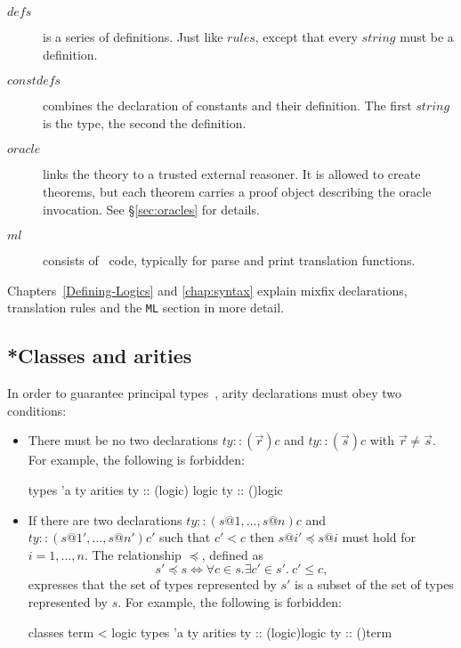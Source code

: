 \begin{description}
\item[$defs$]
  is a series of definitions.  Just like $rules$, except that every $string$
  must be a definition.

\item[$constdefs$] combines the declaration of constants and their
  definition. The first $string$ is the type, the second the definition.

\item[$oracle$] links the theory to a trusted external reasoner.  It is
  allowed to create theorems, but each theorem carries a proof object
  describing the oracle invocation.  See \S\ref{sec:oracles} for details.

\item[$ml$] 
  consists of \ML\ code, typically for parse and print translation functions.
\end{description}
%
Chapters~\ref{Defining-Logics} and \ref{chap:syntax} explain mixfix
declarations, translation rules and the {\tt ML} section in more detail.


\subsection{*Classes and arities}

In order to guarantee principal types~\cite{nipkow-prehofer},
arity declarations must obey two conditions:
\begin{itemize}
\item There must be no two declarations $ty :: (\vec{r})c$ and $ty ::
  (\vec{s})c$ with $\vec{r} \neq \vec{s}$.  For example, the following is
  forbidden:
\begin{ttbox}
types
  'a ty
arities
  ty :: ({\ttlbrace}logic{\ttrbrace}) logic
  ty :: ({\ttlbrace}{\ttrbrace})logic
\end{ttbox}

\item If there are two declarations $ty :: (s@1,\dots,s@n)c$ and $ty ::
  (s@1',\dots,s@n')c'$ such that $c' < c$ then $s@i' \preceq s@i$ must hold
  for $i=1,\dots,n$.  The relationship $\preceq$, defined as
\[ s' \preceq s \iff \forall c\in s. \exists c'\in s'.~ c'\le c, \]
expresses that the set of types represented by $s'$ is a subset of the set of
types represented by $s$.  For example, the following is forbidden:
\begin{ttbox}
classes
  term < logic
types
  'a ty
arities
  ty :: ({\ttlbrace}logic{\ttrbrace})logic
  ty :: ({\ttlbrace}{\ttrbrace})term
\end{ttbox}

\end{itemize}



